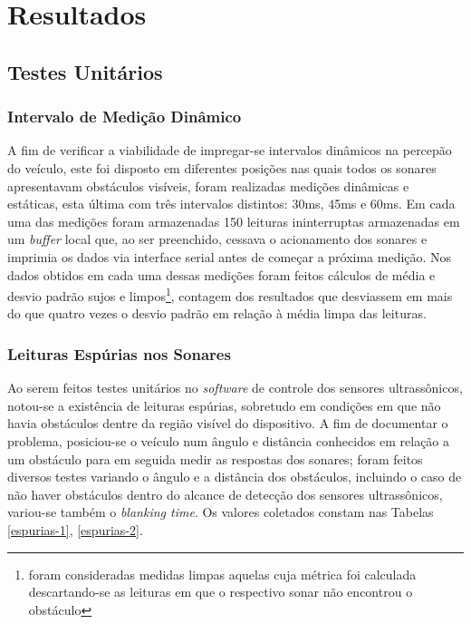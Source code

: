 \chapter{Resultados}

\section{Testes Unitários}

\subsection{Intervalo de Medição Dinâmico}
A fim de verificar a viabilidade de impregar-se intervalos dinâmicos na percepão do veículo, este foi disposto em diferentes posições nas quais todos 
os sonares apresentavam obstáculos visíveis, foram realizadas medições dinâmicas e estáticas, esta última com três intervalos distintos: 30ms, 45ms e 
60ms. Em cada uma das medições foram armazenadas 150 leituras ininterruptas armazenadas em um \textit{buffer} local que, ao ser preenchido, cessava 
o acionamento dos sonares e imprimia os dados via interface serial antes de começar a próxima medição. 
Nos dados obtidos em cada uma dessas medições foram feitos cálculos de média e desvio padrão sujos e limpos\footnote{foram consideradas medidas 
limpas aquelas cuja métrica foi calculada descartando-se as leituras em que o respectivo sonar não encontrou o obstáculo}, contagem dos resultados 
que desviassem em mais do que quatro vezes o desvio padrão em relação à média limpa das leituras.

\subsection{Leituras Espúrias nos Sonares}
Ao serem feitos testes unitários no \textit{software} de controle dos sensores ultrassônicos, notou-se a existência de leituras espúrias, sobretudo 
em condições em que não havia obstáculos dentre da região visível do dispositivo.
A fim de documentar o problema, posiciou-se o veículo num ângulo e distância conhecidos em relação a um obstáculo para em seguida medir as respostas 
dos sonares; foram feitos diversos testes variando o ângulo e a distância dos obstáculos, incluindo o caso de não haver obstáculos dentro do 
alcance de detecção dos sensores ultrassônicos, variou-se também o \textit{blanking time}.
Os valores coletados constam nas Tabelas \ref{espurias-1}, \ref{espurias-2}.

